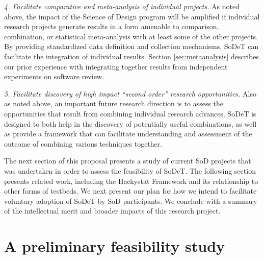 {\em 4. Facilitate comparative and meta-analysis of individual
projects.} As noted above, the impact of the Science of Design program will
be amplified if individual research projects generate results in a form
amenable to comparison, combination, or statistical meta-analysis with at
least some of the other projects.  By providing standardized data
definition and collection mechanisms, SoDeT can facilitate the integration
of individual results. Section \ref{sec:metaanalysis} describes our prior
experience with integrating together results from independent experiments
on software review.

{\em 5. Facilitate discovery of high impact ``second order'' research
opportunities.}  Also as noted above, an important future research
direction is to assess the opportunities that result from combining
individual research advances.  SoDeT is designed to both help in the
discovery of potentially useful combinations, as well as provide a
framework that can facilitate understanding and assessment of the outcome
of combining various techniques together.

The next section of this proposal presents a study of current SoD projects
that was undertaken in order to assess the feasibility of SoDeT.  The
following section presents related work, including the Hackystat Framework
and its relationship to other forms of testbeds.  We next present our plan
for how we intend to facilitate voluntary adoption of SoDeT by
SoD participants. We conclude with a summary of the intellectual merit and broader
impacts of this research project.

\section{A preliminary feasibility study}
\label{sec:preliminary-study}

